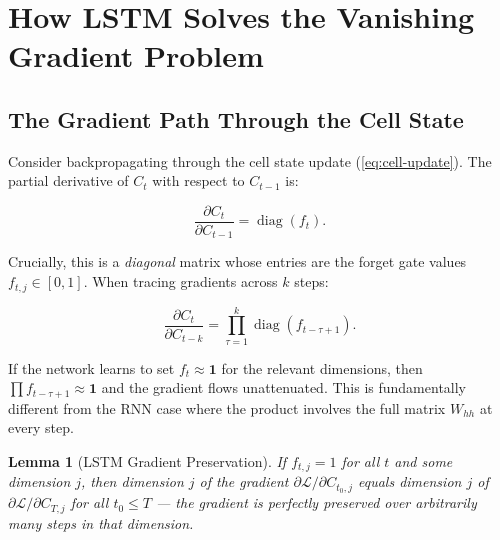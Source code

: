 \documentclass[12pt,a4paper]{article}
\newtheorem{lemma}[theorem]{Lemma}
\begin{document}
\section{How LSTM Solves the Vanishing Gradient Problem}
\label{sec:solution}

\subsection{The Gradient Path Through the Cell State}
\label{subsec:grad-path}

Consider backpropagating through the cell state update
(\cref{eq:cell-update}). The partial derivative of $C_t$ with respect to
$C_{t-1}$ is:

\begin{equation}
  \label{eq:cell-grad}
  \frac{\partial C_t}{\partial C_{t-1}}
  = \operatorname{diag}(f_t).
\end{equation}

Crucially, this is a \emph{diagonal} matrix whose entries are the forget
gate values $f_{t,j} \in [0,1]$. When tracing gradients across $k$ steps:

\begin{equation}
  \label{eq:cell-grad-multi}
  \frac{\partial C_t}{\partial C_{t-k}}
  = \prod_{\tau=1}^{k} \operatorname{diag}(f_{t-\tau+1}).
\end{equation}

If the network learns to set $f_t \approx \mathbf{1}$ for the relevant
dimensions, then $\prod f_{t-\tau+1} \approx \mathbf{1}$ and the gradient
flows unattenuated. This is fundamentally different from the RNN case where
the product involves the full matrix $W_{hh}$ at every step.

\begin{lemma}[LSTM Gradient Preservation]
  \label{lem:lstm-gradient}
  If $f_{t,j} = 1$ for all $t$ and some dimension $j$, then dimension $j$
  of the gradient $\partial \mathcal{L}/\partial C_{t_0,j}$ equals
  dimension $j$ of $\partial \mathcal{L}/\partial C_{T,j}$ for all
  $t_0 \leq T$ --- the gradient is perfectly preserved over arbitrarily
  many steps in that dimension.
\end{lemma}
\end{document}
